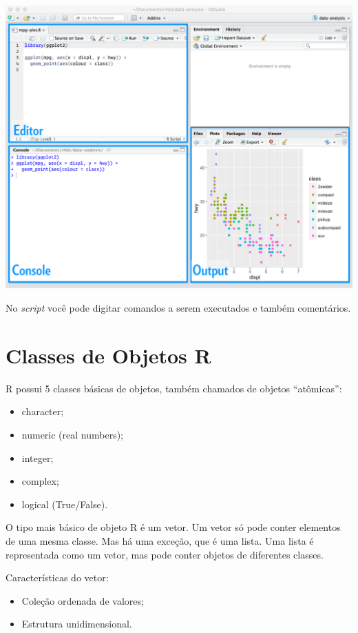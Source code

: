 \documentclass[]{book}
\begin{document}
\begin{center}\includegraphics[width=0.9\linewidth]{imagens/rstudio-editor} \end{center}

No \emph{script} você pode digitar comandos a serem executados e também comentários.

\hypertarget{classes-de-objetos-r}{%
\section{Classes de Objetos R}\label{classes-de-objetos-r}}

R possui 5 classes básicas de objetos, também chamados de objetos ``atômicas'':

\begin{itemize}
\item
  character;
\item
  numeric (real numbers);
\item
  integer;
\item
  complex;
\item
  logical (True/False).
\end{itemize}

O tipo mais básico de objeto R é um vetor. Um vetor só pode conter elementos de uma mesma classe. Mas há uma exceção, que é uma lista. Uma lista é representada como um vetor, mas pode conter objetos de diferentes classes.

Características do vetor:

\begin{itemize}
\item
  Coleção ordenada de valores;
\item
  Estrutura unidimensional.
\end{itemize}
\end{document}
